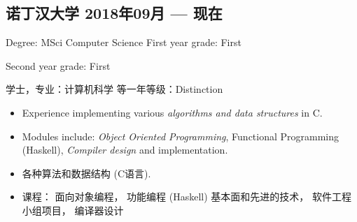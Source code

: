 \begin{xcn}
        \subsection{诺丁汉大学
        \hfill 2018年09月 --- 现在}
\end{xcn}
\begin{xen}
        Degree: MSci Computer Science
        \hfill
        First year grade: First\\
        {\raggedleft Second year grade: First\par}
\end{xen}
\begin{xcn}
        学士，专业：计算机科学
        \hfill
        等一年等级：Distinction\\
        {}
\end{xcn}
\begin{xen}
        \begin{itemize}
            \item Experience implementing various \emph{algorithms and data
                structures} in C.
            \item Modules include: \emph{Object Oriented Programming},
                Functional Programming (Haskell), \emph{Compiler design} and
                implementation.
        \end{itemize}
\end{xen}
\begin{xcn} %
        \begin{itemize}
            \item 各种算法和数据结构 (C语言).
            \item 课程：
面向对象编程，
功能编程 (Haskell) \textendash{} 基本面和先进的技术，
软件工程小组项目，
编译器设计
        \end{itemize}
\end{xcn}
